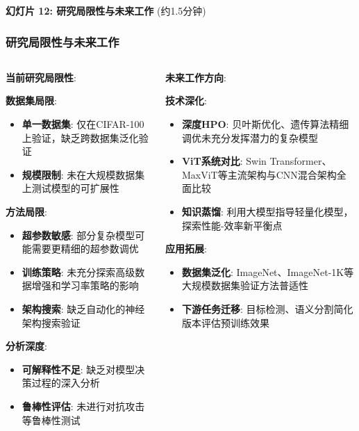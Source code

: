 \documentclass[10pt]{beamer}
\begin{document}
\begin{frame}{\textbf{幻灯片 12: 研究局限性与未来工作} (约1.5分钟)}
\frametitle{研究局限性与未来工作}

\begin{columns}[T]
    \begin{column}{0.5\textwidth}
        {\scriptsize \textbf{当前研究局限性}:
        
        \textbf{数据集局限}:
        \begin{itemize}
            \item \textbf{单一数据集}: 仅在CIFAR-100上验证，缺乏跨数据集泛化验证
            \item \textbf{规模限制}: 未在大规模数据集上测试模型的可扩展性
        \end{itemize}
        
        \textbf{方法局限}:
        \begin{itemize}
            \item \textbf{超参数敏感}: 部分复杂模型可能需要更精细的超参数调优
            \item \textbf{训练策略}: 未充分探索高级数据增强和学习率策略的影响
            \item \textbf{架构搜索}: 缺乏自动化的神经架构搜索验证
        \end{itemize}
        
        \textbf{分析深度}:
        \begin{itemize}
            \item \textbf{可解释性不足}: 缺乏对模型决策过程的深入分析
            \item \textbf{鲁棒性评估}: 未进行对抗攻击等鲁棒性测试
        \end{itemize}}
    \end{column}
    \begin{column}{0.5\textwidth}
        {\scriptsize \textbf{未来工作方向}:
        
        \textbf{技术深化}:
        \begin{itemize}
            \item \textbf{深度HPO}: 贝叶斯优化、遗传算法精细调优未充分发挥潜力的复杂模型
            \item \textbf{ViT系统对比}: Swin Transformer、MaxViT等主流架构与CNN混合架构全面比较
            \item \textbf{知识蒸馏}: 利用大模型指导轻量化模型，探索性能-效率新平衡点
        \end{itemize}
        
        \textbf{应用拓展}:
        \begin{itemize}
            \item \textbf{数据集泛化}: ImageNet、ImageNet-1K等大规模数据集验证方法普适性
            \item \textbf{下游任务迁移}: 目标检测、语义分割简化版本评估预训练效果
        \end{itemize}
        
}
\end{column}
\end{columns}
\end{frame}
\end{document}
